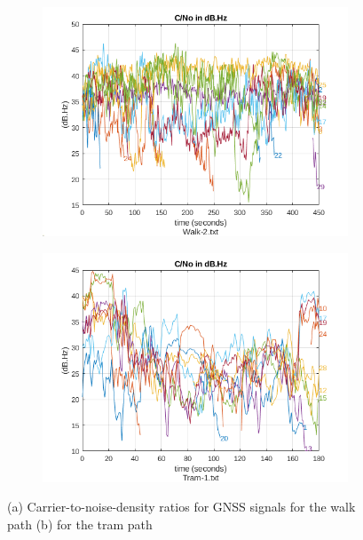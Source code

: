 \documentclass[twoside]{article}
\begin{document}
\begin{figure}[H]
\centering
\begin{subfigure}[b]{0.5\textwidth}
   \includegraphics[width=1\linewidth]{CNo-Walk-2.png}
   \caption{}
   \label{fig:Ng1} 
\end{subfigure}

\begin{subfigure}[b]{0.5\textwidth}
   \includegraphics[width=1\linewidth]{CNo-Tram-1.png}
   \caption{}
   \label{fig:Ng2}
\end{subfigure}

\caption[Two numerical solutions]{(a) Carrier-to-noise-density ratios for GNSS signals for the walk
path (b) for the tram path}
\end{figure}
\end{document}
